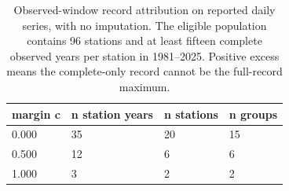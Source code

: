 \begin{table}[p]
\caption{Exploratory direction stability; positive differences favor distribution regression. MAE and trend entries are fractional reductions; CRPS entries are score differences in degrees C. These are repeated analyses of the same archive.}
\label{tab:stability12}
\centering\small
{}
\end{table}
\begin{table}[p]
\caption{Observed-window record attribution on reported daily series, with no imputation. The eligible population contains 96 stations and at least fifteen complete observed years per station in 1981--2025. Positive excess means the complete-only record cannot be the full-record maximum.}
\label{tab:observed-record-main}
\centering\small
\begin{tabular}{llll}
\toprule
margin c & n station years & n stations & n groups \\
\midrule
0.000 & 35 & 20 & 15 \\
0.500 & 12 & 6 & 6 \\
1.000 & 3 & 2 & 2 \\
\bottomrule
\end{tabular}
\end{table}
